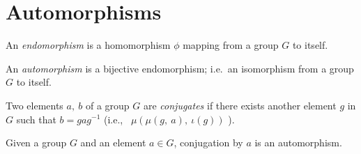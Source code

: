 \section{Automorphisms}

\begin{definition}[Endomorphism]
    \label{definition : Endomorphism}
    \leanok
    An \emph{endomorphism} is a homomorphism \( \phi \) mapping from a group \( G \) to itself.
\end{definition}

\begin{definition}[Automorphism]
    \label{definition : Automorphism}
    \leanok
    An \emph{automorphism} is a bijective endomorphism; i.e.~an isomorphism
    from a group \( G \) to itself.
\end{definition}

\begin{definition}[conjugate]
    \label{definition : conjugate}
    \leanok
    Two elements \( a,~b \) of a group \( G \) are \emph{conjugates} if there
    exists another element \( g \) in \( G \) such that \( b = gag^{-1} \) (i.e.,~ \(
    \mu(\mu(g,~a),~\iota(g)) \) ).
\end{definition}

\begin{theorem}
    \label{theorem : conj_automorphism}
    \leanok
    Given a group \( G \) and an element \( a \in G \), conjugation by \( a \)
    is an automorphism.
\end{theorem}
